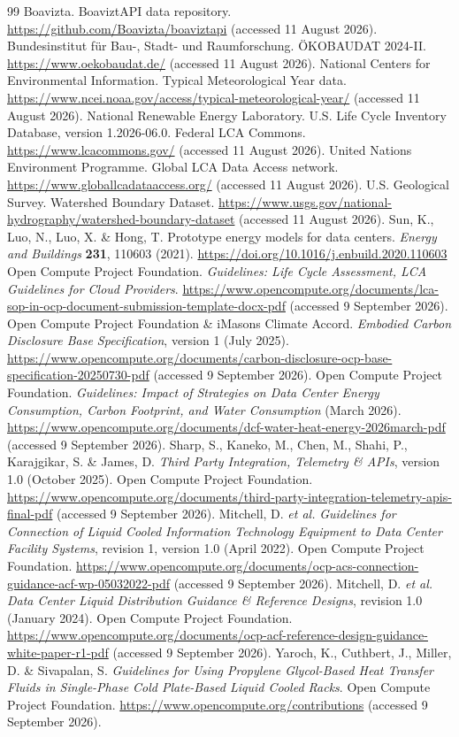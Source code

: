 \documentclass[review,a4paper,fleqn]{cas-sc}
\begin{document}
\begin{thebibliography}{99}
 Boavizta. BoaviztAPI data repository. \url{https://github.com/Boavizta/boaviztapi} (accessed 11 August 2026).
 Bundesinstitut für Bau-, Stadt- und Raumforschung. ÖKOBAUDAT 2024-II. \url{https://www.oekobaudat.de/} (accessed 11 August 2026).
 National Centers for Environmental Information. Typical Meteorological Year data. \url{https://www.ncei.noaa.gov/access/typical-meteorological-year/} (accessed 11 August 2026).
 National Renewable Energy Laboratory. U.S. Life Cycle Inventory Database, version 1.2026-06.0. Federal LCA Commons. \url{https://www.lcacommons.gov/} (accessed 11 August 2026).
 United Nations Environment Programme. Global LCA Data Access network. \url{https://www.globallcadataaccess.org/} (accessed 11 August 2026).
 U.S. Geological Survey. Watershed Boundary Dataset. \url{https://www.usgs.gov/national-hydrography/watershed-boundary-dataset} (accessed 11 August 2026).
 Sun, K., Luo, N., Luo, X. \& Hong, T. Prototype energy models for data centers. \textit{Energy and Buildings} \textbf{231}, 110603 (2021). \url{https://doi.org/10.1016/j.enbuild.2020.110603}
 Open Compute Project Foundation. \textit{Guidelines: Life Cycle Assessment, LCA Guidelines for Cloud Providers}. \url{https://www.opencompute.org/documents/lca-sop-in-ocp-document-submission-template-docx-pdf} (accessed 9 September 2026).
 Open Compute Project Foundation \& iMasons Climate Accord. \textit{Embodied Carbon Disclosure Base Specification}, version 1 (July 2025). \url{https://www.opencompute.org/documents/carbon-disclosure-ocp-base-specification-20250730-pdf} (accessed 9 September 2026).
 Open Compute Project Foundation. \textit{Guidelines: Impact of Strategies on Data Center Energy Consumption, Carbon Footprint, and Water Consumption} (March 2026). \url{https://www.opencompute.org/documents/dcf-water-heat-energy-2026march-pdf} (accessed 9 September 2026).
 Sharp, S., Kaneko, M., Chen, M., Shahi, P., Karajgikar, S. \& James, D. \textit{Third Party Integration, Telemetry \& APIs}, version 1.0 (October 2025). Open Compute Project Foundation. \url{https://www.opencompute.org/documents/third-party-integration-telemetry-apis-final-pdf} (accessed 9 September 2026).
 Mitchell, D. \textit{et al.} \textit{Guidelines for Connection of Liquid Cooled Information Technology Equipment to Data Center Facility Systems}, revision 1, version 1.0 (April 2022). Open Compute Project Foundation. \url{https://www.opencompute.org/documents/ocp-acs-connection-guidance-acf-wp-05032022-pdf} (accessed 9 September 2026).
 Mitchell, D. \textit{et al.} \textit{Data Center Liquid Distribution Guidance \& Reference Designs}, revision 1.0 (January 2024). Open Compute Project Foundation. \url{https://www.opencompute.org/documents/ocp-acf-reference-design-guidance-white-paper-r1-pdf} (accessed 9 September 2026).
 Yaroch, K., Cuthbert, J., Miller, D. \& Sivapalan, S. \textit{Guidelines for Using Propylene Glycol-Based Heat Transfer Fluids in Single-Phase Cold Plate-Based Liquid Cooled Racks}. Open Compute Project Foundation. \url{https://www.opencompute.org/contributions} (accessed 9 September 2026).
\end{thebibliography}
\end{document}
